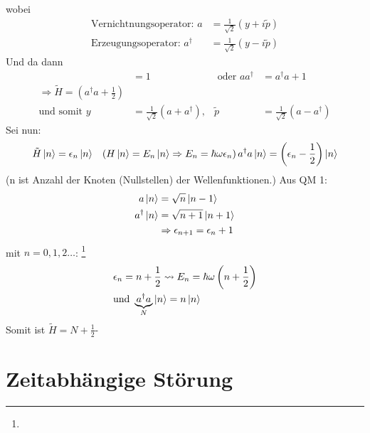 	wobei 
		\begin{align*}
			\text{Vernichtnungsoperator:~} a &= \frac{1}{\sqrt{2}} 
			\left( y + i \tilde{p} \right) \\
			\text{Erzeugungsoperator:~} a^\dagger &= \frac{1}{\sqrt{2}} 
			\left( y - i \tilde{p} \right)
		\end{align*}
	Und da dann
		\begin{align*}
			[a , a^\dagger] &= 1 &\text{~oder~} a a^\dagger &= a^\dagger a + 1 \\
			\Rightarrow \tilde{H} = \left( a^\dagger a + \frac{1}{2} \right)& \\
			\text{und somit~} 
			y &= \frac{1}{\sqrt{2}} \left( a + a^\dagger \right),& 
			\tilde{p} &= \frac{1}{\sqrt{2}} \left( a - a^\dagger \right)
		\end{align*}
	Sei nun:
		\begin{align*}
			\tilde{H} \ket{n} &= \epsilon_n \ket{n} &\left( H \ket{n} = E_n \ket{n} 
			\Rightarrow E_n = \hbar \omega \epsilon_n \right)
			a^\dagger a \ket{n} = \left( \epsilon_n - \frac{1}{2} \right) \ket{n}
		\end{align*}
	(n ist Anzahl der Knoten (Nullstellen) der Wellenfunktionen.)
	Aus QM 1:
		\begin{align*}
			a \ket{n} &= \sqrt{n} \ket{n-1} \\
			a^\dagger \ket {n} &= \sqrt{n+1} \ket{n+1} \\
			&\Rightarrow \epsilon_{n+1} = \epsilon_n + 1
		\end{align*}
	mit $n = 0, 1, 2 \ldots$: \footnote{}
		\begin{align*}
			&\epsilon_n = n + \frac{1}{2} \leadsto E_n = \hbar \omega \left(n + \frac{1}{2} \right) \\
			&\text{und~} \underbrace{a^\dagger a}_{\substack{N}}
			\ket{n} = n \ket{n}
		\end{align*} %
	Somit ist $\tilde{H} = N + \frac{1}{2}$-
	
\section{Zeitabhängige Störung}
